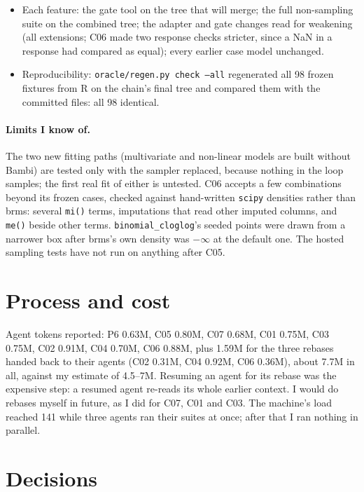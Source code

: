 \documentclass[11pt]{article}
\newcommand{\code}[1]{\texttt{#1}}
\begin{document}
\begin{itemize}
\item Each feature: the gate tool on the tree that will merge; the full non-sampling suite on the combined tree; the
  adapter and gate changes read for weakening (all extensions; C06 made two response checks stricter, since a NaN in a
  response had compared as equal); every earlier case model unchanged.
\item Reproducibility: \code{oracle/regen.py check --all} regenerated all 98 frozen fixtures from R on the chain's
  final tree and compared them with the committed files: all 98 identical.
\end{itemize}

\paragraph{Limits I know of.} The two new fitting paths (multivariate and non-linear models are built without Bambi)
are tested only with the sampler replaced, because nothing in the loop samples; the first real fit of either is
untested. C06 accepts a few combinations beyond its frozen cases, checked against hand-written \code{scipy} densities
rather than brms: several \code{mi()} terms, imputations that read other imputed columns, and \code{me()} beside other
terms. \code{binomial\_cloglog}'s seeded points were drawn from a narrower box after brms's own density was $-\infty$ at the
default one. The hosted sampling tests have not run on anything after C05.

\section{Process and cost}
\label{sec:cost}

Agent tokens reported: P6 0.63M, C05 0.80M, C07 0.68M, C01 0.75M, C03 0.75M, C02 0.91M, C04 0.70M, C06 0.88M, plus
1.59M for the three rebases handed back to their agents (C02 0.31M, C04 0.92M, C06 0.36M), about 7.7M in all, against my
estimate of 4.5--7M. Resuming an agent for its rebase was the expensive step: a resumed agent re-reads its whole
earlier context. I would do rebases myself in future, as I did for C07, C01 and C03. The machine's load reached 141
while three agents ran their suites at once; after that I ran nothing in parallel.

\section{Decisions}
\label{sec:decisions}
\end{document}
